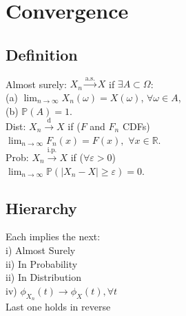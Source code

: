 \section{Convergence}
	\subsection*{Definition}
	Almost surely: $X_{n}\stackrel{\text{a.s.}}{\to}X$ if $\exists A\subset\Omega$:\\
	(a) $\lim_{n\to\infty}X_{n}\left(\omega\right) = X\left(\omega\right)$, $\forall\omega\in A$,\\
	(b) $\mathbb{P}\left(A\right) = 1$.\\
	Dist: $X_{n}\stackrel{\text{d}}{\to}X$ if ($F$ and $F_{n}$ CDFs)\\
	$\lim_{n\to\infty}F_{n}\left(x\right) = F\left(x\right),$ $\forall x\in\mathbb{R}$.\\
	Prob: $X_{n}\stackrel{\text{i.p.}}{\to}X$ if ($\forall\varepsilon > 0$)\\
	$\lim_{n\to\infty}\mathbb{P}\left(\left|X_{n} - X\right|\geq\varepsilon\right) = 0$.
	
	\subsection*{Hierarchy}
	Each implies the next:\\
	i) Almost Surely\\
	ii) In Probability\\
	ii) In Distribution\\
	iv) $\phi_{X_{n}}\left(t\right)\to\phi_{X}\left(t\right), \forall t$\\
	Last one holds in reverse
